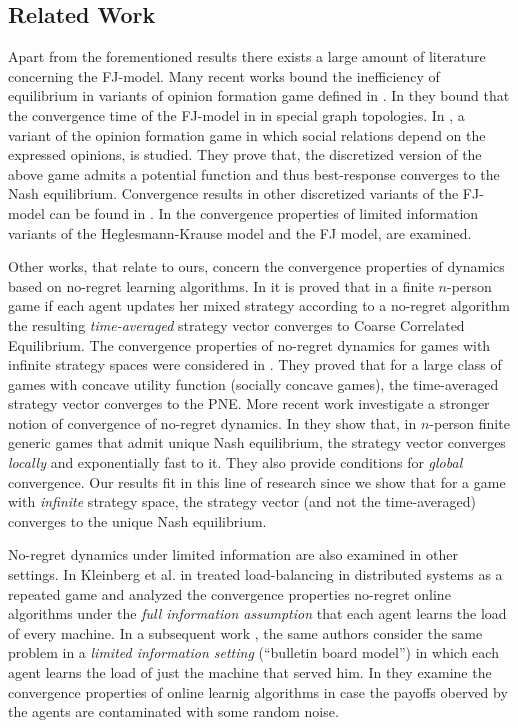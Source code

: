 \subsection{Related Work}
Apart from the forementioned results there exists a large amount 
of literature concerning the FJ-model.
Many recent works \cite{BGM13,CKO13,BFM16,EFHS17} bound the 
inefficiency of equilibrium in variants of opinion formation game 
defined in \cite{BKO11}. In \cite{GS14} they bound that the convergence 
time of the FJ-model in in special graph topologies.
In \cite{BFM16}, a variant of the opinion formation game in which social
relations depend on the expressed opinions, is studied.
They prove that, the discretized version of the above game admits
a potential function and thus best-response converges to the
Nash equilibrium. Convergence results in other discretized variants of
the FJ-model can be found in \cite{YOASS13,FGV16}. In \cite{FPS16} the convergence
properties of limited information variants of the Heglesmann-Krause model \cite{HK} 
and the FJ model, are examined.


Other works, that relate to ours, concern the convergence
properties of dynamics based on no-regret learning algorithms.
In \cite{FV97,FS99,SA00,SALS15} it is proved that in a finite $n$-person
game if each agent updates her mixed strategy according to a no-regret
algorithm the resulting \emph{time-averaged} strategy vector converges to
Coarse Correlated Equilibrium. The convergence properties of no-regret dynamics 
for games with infinite strategy spaces were considered in \cite{EMN09}.
They proved that for a large class of games with concave utility function
(socially concave games), the time-averaged strategy vector converges to
the PNE. More recent work investigate a stronger notion of convergence of
no-regret dynamics. In \cite{CHM17} they show that,
in $n$-person finite generic games that admit unique Nash equilibrium,
the strategy vector converges \emph{locally} and exponentially fast
to it. They also provide conditions for \emph{global} convergence.
Our results fit in this line of research since we show that
for a game with \emph{infinite} strategy space, the strategy vector
(and not the time-averaged) converges to the unique Nash equilibrium.

No-regret dynamics under limited information are also examined
in other settings. In Kleinberg et al. in \cite{KPT09} treated 
load-balancing in distributed systems as
a repeated game and analyzed the convergence properties
no-regret online algorithms under the \emph{full information assumption} 
that each agent learns the load of every machine. 
In a subsequent work \cite{KPT11}, the same authors consider the
same problem in a \emph{limited information setting} (\enquote{bulletin board model})
in which each agent learns the load of just the machine 
that served him. In \cite{HCM17,MS17} they examine the convergence
properties of online learnig algorithms in case the payoffs oberved 
by the agents are contaminated with some random noise. 



